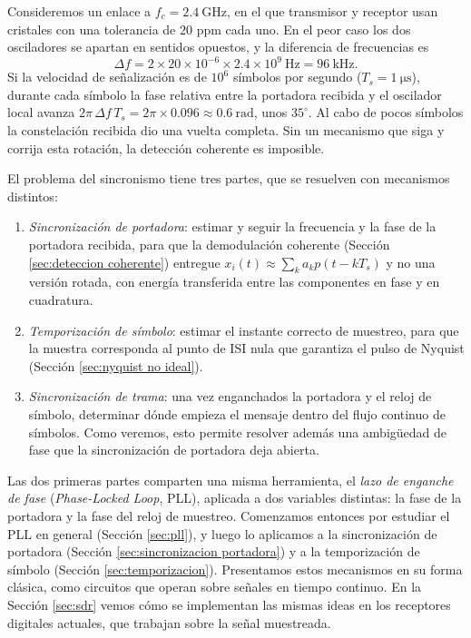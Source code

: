 \begin{ejemplo}\label{ejemplo:cfo}
Consideremos un enlace a $f_c=2.4\ \unit{\giga\hertz}$, en el que transmisor y receptor usan cristales con una tolerancia de $20$ ppm cada uno. En el peor caso los dos osciladores se apartan en sentidos opuestos, y la diferencia de frecuencias es
\begin{equation*}
    \Delta f = 2\times 20\times 10^{-6}\times 2.4\times 10^{9}\ \unit{\hertz} = 96\ \unit{\kilo\hertz}.
\end{equation*}
Si la velocidad de señalización es de $10^6$ símbolos por segundo ($T_s=1\ \unit{\micro\second}$), durante cada símbolo la fase relativa entre la portadora recibida y el oscilador local avanza $2\pi\,\Delta f\, T_s = 2\pi\times 0.096\approx 0.6\ \unit{\radian}$, unos $35^\circ$. Al cabo de pocos símbolos la constelación recibida dio una vuelta completa. Sin un mecanismo que siga y corrija esta rotación, la detección coherente es imposible.
\end{ejemplo}

El problema del sincronismo tiene tres partes, que se resuelven con mecanismos distintos:
\begin{enumerate}
    \item \emph{Sincronización de portadora}: estimar y seguir la frecuencia y la fase de la portadora recibida, para que la demodulación coherente (Sección \ref{sec:deteccion coherente}) entregue $x_i(t)\approx\sum_k a_k p(t-kT_s)$ y no una versión rotada, con energía transferida entre las componentes en fase y en cuadratura.
    \item \emph{Temporización de símbolo}: estimar el instante correcto de muestreo, para que la muestra corresponda al punto de ISI nula que garantiza el pulso de Nyquist (Sección \ref{sec:nyquist no ideal}).
    \item \emph{Sincronización de trama}: una vez enganchados la portadora y el reloj de símbolo, determinar dónde empieza el mensaje dentro del flujo continuo de símbolos. Como veremos, esto permite resolver además una ambigüedad de fase que la sincronización de portadora deja abierta.
\end{enumerate}
Las dos primeras partes comparten una misma herramienta, el \emph{lazo de enganche de fase} (\emph{Phase-Locked Loop}, PLL), aplicada a dos variables distintas: la fase de la portadora y la fase del reloj de muestreo. Comenzamos entonces por estudiar el PLL en general (Sección \ref{sec:pll}), y luego lo aplicamos a la sincronización de portadora (Sección \ref{sec:sincronizacion portadora}) y a la temporización de símbolo (Sección \ref{sec:temporizacion}). Presentamos estos mecanismos en su forma clásica, como circuitos que operan sobre señales en tiempo continuo. En la Sección \ref{sec:sdr} vemos cómo se implementan las mismas ideas en los receptores digitales actuales, que trabajan sobre la señal muestreada.

